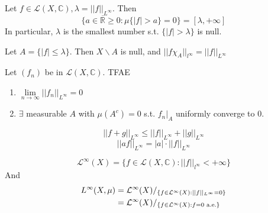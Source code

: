 \begin{proposition}
    Let  $ f\in \mathcal{L}(X,\mathbb{C}),\lambda=||f||_{L^\infty} $. Then 
    \[ \{a\in \overline{\mathbb{R} }\geq 0:\mu\{|f|>a\}=0\}=[\lambda,+\infty]\]
    In particular,  $ \lambda  $ is the smallest number s.t.  $ \{|f|>\lambda\} $ is null. 
\end{proposition}
\begin{corollary}
    Let  $ A=\{|f| \leq \lambda\} $. Then  $ X\backslash A $ is null, and  $ ||f\chi_A||_{l^\infty}=||f||_{L^\infty} $  
\end{corollary}
\begin{proposition}
    Let  $ (f_n) $ be in  $ \mathcal{L}(X,\mathbb{C}) $. TFAE
    \begin{enumerate}[(1)]
        \item  $ \lim\limits_{n \to \infty}||f_n||_{L^\infty}=0 $
        \item  $ \exists  $ measurable  $ A  $ with  $ \mu(A^c)=0 $ s.t.  $ f_n|_A $ uniformly converge to 0. 
    \end{enumerate} 
\end{proposition}
\begin{proposition}
    \[||f+g||_{L^\infty} \leq||f||_{L^\infty}+||g||_{L^\infty}\]
    \[||af||_{L^\infty}=|a|\cdot||f||_{L^\infty}\]
\end{proposition}
\begin{definition}
    \[\mathcal{L}^\infty(X)=\{f\in \mathcal{L}(X,\mathbb{C}):||f||_{l^\infty}<+\infty\}\]
    And   
    \begin{align}
        L^\infty(X,\mu)&=\mathcal{L}^\infty(X)/_{\{f\in \mathcal{L}^\infty(X):||f||_{L^\infty}=0\}}\notag\\
        &=\mathcal{L}^\infty(X)/_{\{f\in \mathcal{L}^\infty(X):f=0\text{ a.e.}\}}\notag
    \end{align}
\end{definition}